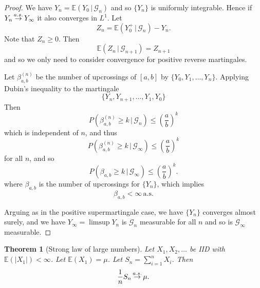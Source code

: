 \documentclass[10pt, oneside, reqno]{amsart}
\theoremstyle{plain}%
\newtheorem{thm}{Theorem}[section]
\theoremstyle{definition}
\theoremstyle{remark}
\newcommand{\given}{ \, | \,}
\newcommand{\E}{\mathbb{E}}
\def\cas{\,{\buildrel a.s. \over \rightarrow}\,}
\newcommand{\sigg}{\mathcal{G}}
\newcommand{\sumni}{\sum_{i=1}^n}
\begin{document}
\begin{proof}
	We have $Y_n = \E(Y_0 \given \sigg_n)$ and so $\{ Y_n \}$ is uniformly integrable.  Hence if $Y_n \cas Y_\infty$ it also converges in $L^1$.  Let \[
		Z_n = \E(Y_0^+ \given \sigg_n) - Y_n.
	\]  Note that $Z_n \geq 0$.  Then \[
		\E(Z_n \given \sigg_{n+1}) = Z_{n+1}
	\] and so we only need to consider convergence for positive reverse martingales.  
	
	Let $\beta_{a,b}^{(n)}$ be the number of upcrossings of $[a,b]$ by $\{ Y_0, Y_1, \dots, Y_n \}$.  Applying Dubin's inequality to the martingale \[
		\{ Y_n, Y_{n+1}, \dots, Y_{1}, Y_0 \}
	\] Then \[
		P(\beta_{a,b}^{(n)} \geq k \given \sigg_n) \leq \left( \frac{a}{b} \right)^k
	\] which is independent of $n$, and thus \[
		P(\beta_{a,b}^{(n)} \geq k \given \sigg_\infty) \leq \left( \frac{a}{b} \right)^k
	\] for all $n$, and so \[
		P(\beta_{a,b} \geq k \given \sigg_\infty) \leq \left( \frac{a}{b} \right)^k.
	\] where $\beta_{a,b}$ is the number of upcrossings for $\{ Y_n \}$, which implies \[
		\beta_{a,b} < \infty \, \text{a.s.}
	\] 
	
	Arguing as in the positive supermartingale case, we have $\{ Y_n \}$ converges almost surely, and we have $Y_\infty = \limsup Y_n$ is $\sigg_n$ measurable for all $n$ and so is $\sigg_\infty$ measurable.  
\end{proof}

\begin{thm}[Strong law of large numbers]
	Let $X_1, X_2, \dots$ be IID with $\E(|X_1|) < \infty$.  Let $\E(X_1) = \mu$.  Let $S_n = \sumni X_i$.  Then \[
		\frac{1}{n} S_n \cas \mu.
	\]
\end{thm}
\end{document}
